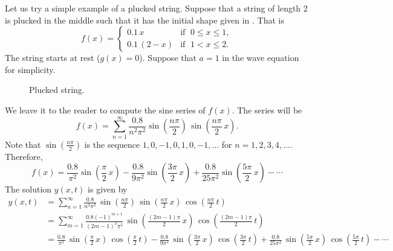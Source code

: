 \documentclass[12pt]{book}
\begin{document}
\begin{example}
Let us try a simple example of a plucked string.  Suppose that
a string of length 2
is plucked in the middle such that it has the initial shape given
in .  That is
\begin{equation*}
f(x) = \begin{cases}
0.1\, x & \text{if } \; 0 \leq x \leq 1 , \\
0.1\, (2-x) & \text{if } \; 1 < x \leq 2 .
\end{cases}
\end{equation*}
The string starts at rest ($g(x) =
0$).  Suppose that $a=1$ in the wave
equation for simplicity.

\begin{figure}[h!t]
\capstart
\begin{center}
\caption{Plucked string.\label{wave:pluckedstrfig}}
\end{center}
\end{figure}

We leave it to the reader to compute the sine series of $f(x)$.  The series
will be
\begin{equation*}
f(x) = \sum_{n=1}^\infty
\frac{0.8}{n^2 \pi^2}
\sin \left( \frac{n \pi}{2} \right) \,
\sin \left( \frac{n \pi}{2} \, x \right) .
\end{equation*}
Note that 
$\sin \left( \frac{n \pi}{2} \right)$
is the sequence $1, 0, -1, 0, 1, 0, -1, \ldots$
for $n = 1,2,3,4,\ldots$.  Therefore,
\begin{equation*}
f(x) = 
\frac{0.8}{\pi^2}
\sin \left( \frac{\pi}{2} \, x \right)
-
\frac{0.8}{9 \pi^2}
\sin \left( \frac{3 \pi}{2} \, x \right)
+
\frac{0.8}{25 \pi^2}
\sin \left( \frac{5 \pi}{2} \, x \right)
- \cdots
\end{equation*}
The solution $y(x,t)$ is given by
\begin{equation*}
\begin{split}
y(x,t) & = 
\sum_{n=1}^\infty
\frac{0.8}{n^2 \pi^2} \,
\sin \left( \frac{n \pi}{2} \right) \,
\sin \left( \frac{n \pi}{2} \, x \right) \,
\cos \left( \frac{n \pi}{2} \, t \right)
\\
& = 
\sum_{m=1}^\infty
\frac{0.8 {(-1)}^{m+1}}{{(2m-1)}^2 \pi^2} \,
\sin \left( \frac{(2m-1) \pi}{2} \, x \right) \,
\cos \left( \frac{(2m-1) \pi}{2} \, t \right)
\\
& =
\frac{0.8}{\pi^2} \,
\sin \left( \frac{\pi}{2} \, x \right) \,
\cos \left( \frac{\pi}{2} \, t \right)
-
\frac{0.8}{9 \pi^2} \,
\sin \left( \frac{3 \pi}{2} \, x \right) \,
\cos \left( \frac{3 \pi}{2} \, t \right)
+
\frac{0.8}{25 \pi^2} \,
\sin \left( \frac{5 \pi}{2} \, x \right) \,
\cos \left( \frac{5 \pi}{2} \, t \right) 
- \cdots
\end{split}
\end{equation*}


\end{example}
\end{document}
